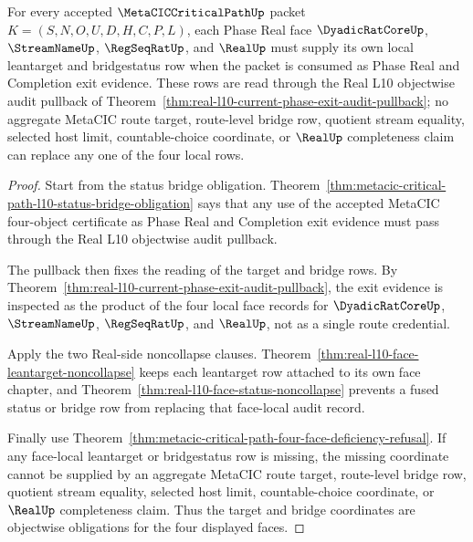\begin{theorem}
\label{thm:metacic-critical-path-l10-face-leantarget-locality}
For every accepted $\MetaCICCriticalPathUp$ packet $K=(S,N,O,U,D,H,C,P,L)$, each Phase Real face $\DyadicRatCoreUp$, $\StreamNameUp$, $\RegSeqRatUp$, and $\RealUp$ must supply its own local leantarget and bridgestatus row when the packet is consumed as Phase Real and Completion exit evidence. These rows are read through the Real L10 objectwise audit pullback of Theorem~\ref{thm:real-l10-current-phase-exit-audit-pullback}; no aggregate MetaCIC route target, route-level bridge row, quotient stream equality, selected host limit, countable-choice coordinate, or $\RealUp$ completeness claim can replace any one of the four local rows.
\end{theorem}
\begin{proof}
Start from the status bridge obligation. Theorem~\ref{thm:metacic-critical-path-l10-status-bridge-obligation} says that any use of the accepted MetaCIC four-object certificate as Phase Real and Completion exit evidence must pass through the Real L10 objectwise audit pullback.

The pullback then fixes the reading of the target and bridge rows. By Theorem~\ref{thm:real-l10-current-phase-exit-audit-pullback}, the exit evidence is inspected as the product of the four local face records for $\DyadicRatCoreUp$, $\StreamNameUp$, $\RegSeqRatUp$, and $\RealUp$, not as a single route credential.

Apply the two Real-side noncollapse clauses. Theorem~\ref{thm:real-l10-face-leantarget-noncollapse} keeps each leantarget row attached to its own face chapter, and Theorem~\ref{thm:real-l10-face-status-noncollapse} prevents a fused status or bridge row from replacing that face-local audit record.

Finally use Theorem~\ref{thm:metacic-critical-path-four-face-deficiency-refusal}. If any face-local leantarget or bridgestatus row is missing, the missing coordinate cannot be supplied by an aggregate MetaCIC route target, route-level bridge row, quotient stream equality, selected host limit, countable-choice coordinate, or $\RealUp$ completeness claim. Thus the target and bridge coordinates are objectwise obligations for the four displayed faces.
\end{proof}

